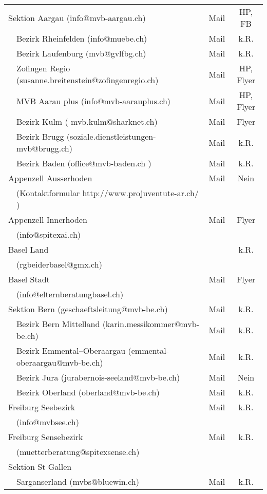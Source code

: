 \begin{longtable}[htbp]{|p{0.2em} p{20em} | c | c |}
  
  \multicolumn{2}{|l|}{Sektion Aargau (info@mvb-aargau.ch)} & Mail & HP, FB\\
  & Bezirk Rheinfelden (info@muebe.ch) & Mail & k.R.\\
  & Bezirk Laufenburg (mvb@gvlfbg.ch) & Mail & k.R.\\
  & Zofingen Regio (susanne.breitenstein@zofingenregio.ch) & Mail & HP, Flyer \\
  & MVB Aarau plus (info@mvb-aarauplus.ch) & Mail & HP, Flyer \\
  & Bezirk Kulm ( mvb.kulm@sharknet.ch) & Mail & Flyer\\
  & Bezirk Brugg (soziale.dienstleistungen-mvb@brugg.ch) & Mail & k.R.\\
  & Bezirk Baden (office@mvb-baden.ch ) & Mail & k.R. \\
   \multicolumn{2}{|l|}{Appenzell Ausserhoden } & Mail & Nein\\
  & (Kontaktformular http://www.projuventute-ar.ch/ ) & & \\
  \multicolumn{2}{|l|}{Appenzell Innerhoden } & Mail & Flyer\\
  & (info@spitexai.ch) & & \\
  \multicolumn{2}{|l|}{Basel Land} & & k.R.\\
  & (rgbeiderbasel@gmx.ch) & & \\
  \multicolumn{2}{|l|}{Basel Stadt} & Mail & Flyer\\
  & (info@elternberatungbasel.ch) & & \\
  \multicolumn{2}{|l|}{Sektion Bern (geschaeftsleitung@mvb-be.ch)} & Mail & k.R.\\
  & Bezirk Bern Mittelland (karin.messikommer@mvb-be.ch) & Mail & k.R. \\
  & Bezirk Emmental–Oberaargau (emmental-oberaargau@mvb-be.ch) & Mail & k.R. \\
  & Bezirk Jura (jurabernois-seeland@mvb-be.ch) & Mail & Nein \\
  & Bezirk Oberland (oberland@mvb-be.ch) & Mail & k.R. \\
  \multicolumn{2}{|l|}{Freiburg Seebezirk} & Mail & k.R.\\
  & (info@mvbsee.ch) & & \\
  \multicolumn{2}{|l|}{Freiburg Sensebezirk} & Mail & k.R.\\
  & (muetterberatung@spitexsense.ch) & & \\
  \multicolumn{2}{|l|}{Sektion St Gallen} &  & \\
  & Sarganserland (mvbs@bluewin.ch) & Mail & k.R.\\

\end{longtable}
